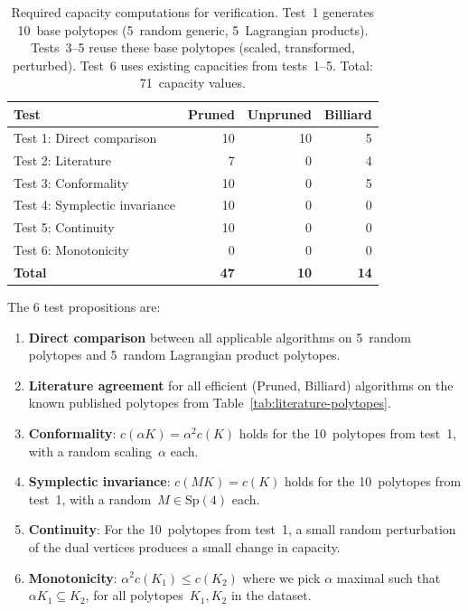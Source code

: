 \begin{table}[h]
\centering
\small
\begin{tabular}{lrrr}
\toprule
Test & Pruned & Unpruned & Billiard \\
\midrule
Test 1: Direct comparison & 10 & 10 & 5 \\
Test 2: Literature & 7 & 0 & 4 \\
Test 3: Conformality & 10 & 0 & 5 \\
Test 4: Symplectic invariance & 10 & 0 & 0 \\
Test 5: Continuity & 10 & 0 & 0 \\
Test 6: Monotonicity & 0 & 0 & 0 \\
\midrule
\textbf{Total} & \textbf{47} & \textbf{10} & \textbf{14} \\
\bottomrule
\end{tabular}
\caption{Required capacity computations for verification. Test~1 generates
  10~base polytopes (5~random generic, 5~Lagrangian products). Tests~3--5
  reuse these base polytopes (scaled, transformed, perturbed). Test~6 uses
  existing capacities from tests~1--5. Total: 71~capacity values.}
\label{tab:verification-capacity-counts}
\end{table}

The 6 test propositions are:
\begin{enumerate}
  \item \textbf{Direct comparison} between all applicable algorithms on
    5~random polytopes and 5~random Lagrangian product polytopes.

  \item \textbf{Literature agreement} for all efficient (Pruned, Billiard)
    algorithms on the known published polytopes from
    Table~\ref{tab:literature-polytopes}.

  \item \textbf{Conformality}: $c(\alpha K) = \alpha^2 c(K)$ holds for the
    10~polytopes from test~1, with a random scaling~$\alpha$ each.

  \item \textbf{Symplectic invariance}: $c(MK) = c(K)$ holds for the
    10~polytopes from test~1, with a random~$M \in \mathrm{Sp}(4)$ each.

  \item \textbf{Continuity}: For the 10~polytopes from test~1, a small
    random perturbation of the dual vertices produces a small change in
    capacity.

  \item \textbf{Monotonicity}: $\alpha^2 c(K_1) \le c(K_2)$ where we pick
    $\alpha$ maximal such that~$\alpha K_1 \subseteq K_2$, for all
    polytopes~$K_1, K_2$ in the dataset.
\end{enumerate}

